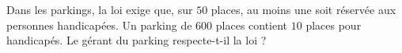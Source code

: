 
\begin{exercice}\label{exosmath-0799}

Dans les parkings, la loi exige que, sur $50$ places, au moins une soit réservée aux personnes handicapées.  Un parking de $600$ places contient $10$ places pour handicapés. Le gérant du parking respecte-t-il la loi ?

\end{exercice}
